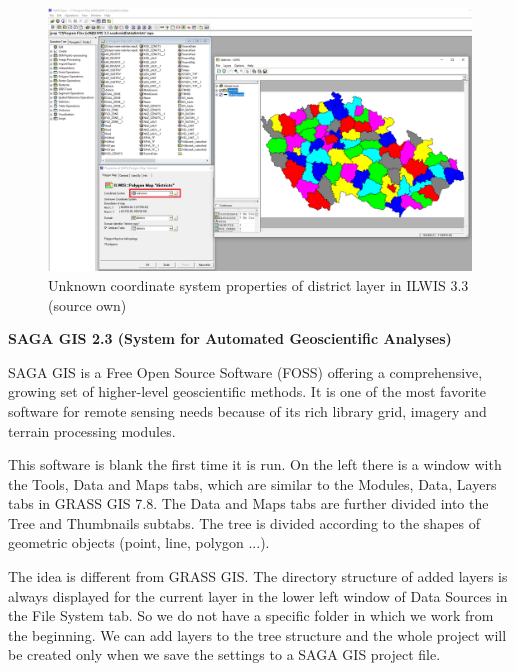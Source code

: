 \documentclass[a4paper,10pt,twoside]{article}
\begin{document}
\vspace{0.3cm}
\begin{figure}[hbt!] 
\begin{center}
\includegraphics[width=15cm]{../pictures/ilwis_pridani_mapy.png} 
\caption[Unknown coordinate system properties of district layer in ILWIS 3.3 (source own)]{Unknown coordinate system properties of district layer in ILWIS 3.3 (source own)}
\label{fig:ilwis_pridani_mapy}
\end{center}
\end{figure}

\bigskip

\noindent \textbf {SAGA GIS 2.3 (System for Automated Geoscientific Analyses)}

\noindent SAGA GIS is a Free Open Source Software (FOSS) offering a comprehensive, growing set of higher-level geoscientific methods. It is one of the most favorite software for remote sensing needs because of its rich library grid, imagery and terrain processing modules.

This software is blank the first time it is run. On the left there is a window with the Tools, Data and Maps tabs, which are similar to the Modules, Data, Layers tabs in GRASS GIS 7.8. The Data and Maps tabs are further divided into the Tree and Thumbnails subtabs. The tree is divided according to the shapes of geometric objects (point, line, polygon ...). 

The idea is different from GRASS GIS. The directory structure of added layers is always displayed for the current layer in the lower left window of Data Sources in the File System tab. So we do not have a specific folder in which we work from the beginning. We can add layers to the tree structure and the whole project will be created only when we save the settings to a SAGA GIS project file.
\end{document}
